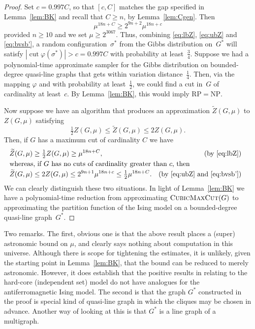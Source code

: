 \documentclass[11pt]{amsart}
\newcommand{\cut}{\mathop{\mathrm{cut}}}
\newcommand{\cubicmaxcut}{\textsc{Cubic\-MaxCut}}
\newcommand{\Ztilde}{\widetilde Z}
\newcommand{\NP}{\mathrm{NP}}
\newcommand{\RP}{\mathrm{RP}}
\let\phi=\varphi
\begin{document}
\begin{proof}
Set $c=0.997 C$, so that $[c,C]$ matches the gap specified in Lemma~\ref{lem:BK} and recall that $C\geq n$, by Lemma~\ref{lem:Cgen}.   Then 
\begin{equation}\label{eq:bvsb'}
\mu^{18n+C}\geq 2^{9n+2}\mu^{18n+c}
\end{equation} 
provided $n\geq10$ and we set $\mu\geq 2^{3067}$.  Thus, combining \eqref{eq:lbZ}, \eqref{eq:ubZ} and \eqref{eq:bvsb'}, a random configuration~$\sigma^*$ from the Gibbs distribution on~$G^*$ will satisfy $|\cut \phi(\sigma^*)|>c=0.997C$ with probability at least~$\frac34$.  Suppose we had a polynomial-time approximate sampler for the Gibbs distribution on bounded-degree quasi-line graphs that gets within variation distance~$\frac14$.  Then, via the mapping $\phi$ and with probability at least~$\frac12$, we could find a cut in~$G$ of cardinality at least~$c$.  By Lemma~\ref{lem:BK}, this would imply $\RP=\NP$.  

Now suppose we have an algorithm that produces an approximation $\Ztilde(G,\mu)$ to $Z(G,\mu)$ satisfying 
$$
\tfrac12 Z(G,\mu)\leq \Ztilde(G,\mu)\leq 2Z(G,\mu).
$$
Then, if $G$ has a maximum cut of cardinality $C$ we have 
\begin{align*}
\Ztilde(G,\mu)&\geq \tfrac12 Z(G,\mu) \geq \mu^{18n+C},&\text{(by \eqref{eq:lbZ})}\\
\noalign{\noindent whereas, if $G$ has no cuts of cardinality greater than $c$, then}
\Ztilde(G,\mu)&\leq 2 Z(G,\mu) \leq 2^{9n+1}\mu^{18n+c}\leq \tfrac12\mu^{18n+C}.&\text{(by \eqref{eq:ubZ} and \eqref{eq:bvsb'})}
\end{align*}
We can clearly distinguish these two situations.  In light of Lemma~\ref{lem:BK} we have a polynomial-time reduction from approximating $\cubicmaxcut(G)$ to approximating the partition function of the Ising model on a bounded-degree quasi-line graph~$G^*$. 
\end{proof}

Two remarks.    The first, obvious one is that the above result places a (super) astronomic bound on $\mu$, and clearly says nothing about computation in this universe.  Although there is scope for tightening the estimates, it is unlikely, given the starting point in Lemma~\ref{lem:BK}, that the bound can be reduced to merely astronomic.  However, it does establish that the positive results in \cite{ChenGu, JerrumHfree, JerrumPatel} relating to the hard-core (independent set) model do not have analogues for the antiferromagnetic Ising model. The second is that the graph $G^*$ constructed in the proof is special kind of quasi-line graph in which the cliques may be chosen in advance.  Another way of looking at this is that $G^*$ is a line graph of a multigraph.  
\end{document}
